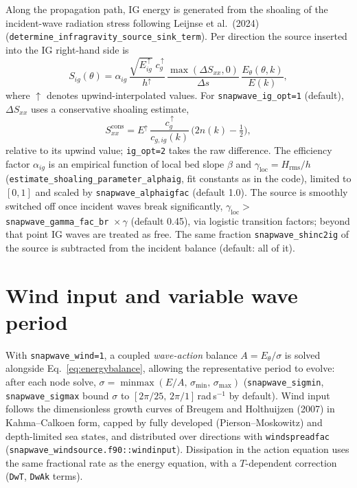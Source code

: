 \documentclass[11pt,a4paper]{article}
\newcommand{\ee}{E_\theta}
\newcommand{\code}[1]{\texttt{#1}}
\begin{document}
Along the propagation path, IG energy is generated from the shoaling of the
incident-wave radiation stress following Leijnse et al.\ (2024)
(\code{determine\_infragravity\_source\_sink\_term}). Per direction the source
inserted into the IG right-hand side is
\begin{equation}
S_{ig}(\theta)=
\alpha_{ig}\,
\frac{\sqrt{E_{ig}^{\,\uparrow}}\; c_g^{\,\uparrow}}{h^{\uparrow}}\,
\frac{\max(\Delta S_{xx},0)}{\Delta s}\,
\frac{\ee(\theta,k)}{E(k)},
\label{eq:srcig}
\end{equation}
where $\uparrow$ denotes upwind-interpolated values. For
\code{snapwave\_ig\_opt=1} (default), $\Delta S_{xx}$ uses a conservative
shoaling estimate,
\begin{equation}
S_{xx}^{\mathrm{cons}}=
E^{\uparrow}\,\frac{c_g^{\,\uparrow}}{c_{g,ig}(k)}\,
\bigl(2n(k)-\tfrac12\bigr),
\end{equation}
relative to its upwind value; \code{ig\_opt=2} takes the raw difference. The
efficiency factor $\alpha_{ig}$ is an empirical function of local bed slope
$\beta$ and $\gamma_{\mathrm{loc}}=H_{\mathrm{rms}}/h$
(\code{estimate\_shoaling\_parameter\_alphaig}, fit constants as in the code),
limited to $[0,1]$ and scaled by \code{snapwave\_alphaigfac} (default 1.0). The
source is smoothly switched off once incident waves break significantly,
$\gamma_{\mathrm{loc}} >$ \code{snapwave\_gamma\_fac\_br}~$\times\,\gamma$
(default 0.45), via logistic transition factors; beyond that point IG waves are
treated as free. The same fraction \code{snapwave\_shinc2ig} of the source is
subtracted from the incident balance (default: all of it).

\section{Wind input and variable wave period}
\label{sec:wind}

With \code{snapwave\_wind=1}, a coupled \emph{wave-action} balance
$A=\ee/\sigma$ is solved alongside Eq.~\eqref{eq:energybalance}, allowing the
representative period to evolve: after each node solve,
$\sigma=\operatorname{minmax}(E/A,\,\sigma_{\min},\,\sigma_{\max})$
(\code{snapwave\_sigmin}, \code{snapwave\_sigmax} bound $\sigma$ to
$[2\pi/25,\,2\pi/1]$\,rad\,s$^{-1}$ by default). Wind input follows the
dimensionless growth curves of Breugem and Holthuijzen (2007) in
Kahma--Calkoen form, capped by fully developed (Pierson--Moskowitz) and
depth-limited sea states, and distributed over directions with
\code{windspreadfac} (\code{snapwave\_windsource.f90::windinput}).
Dissipation in the action equation uses the same fractional rate as the energy
equation, with a $T$-dependent correction (\code{DwT}, \code{DwAk} terms).
\end{document}
